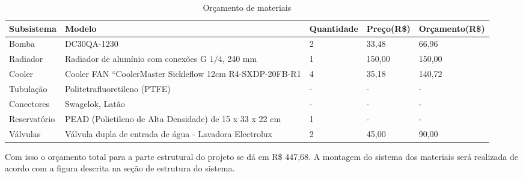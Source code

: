 \begin{table}[htb]
\begin{tabular}{|p{3cm}|p{4cm}|p{3cm}|p{2cm}|p{3cm}|}
\hline
Subsistema & Modelo & Quantidade & Preço(R\$) & Orçamento(R\$) \\
\hline
Bomba & DC30QA-1230  & 2 & 33,48 & 66,96 \\ \hline
Radiador & Radiador de alumínio com conexões G $1/4$, 240 mm & 1 & 150,00 & 150,00\\ \hline
Cooler & Cooler FAN “CoolerMaster Sickleflow 12cm R4-SXDP-20FB-R1 & 4 & 35,18 & 140,72\\ \hline
Tubulação & Politetrafluoretileno (PTFE) & - & - & -\\ \hline
Conectores & Swagelok, Latão & - & -  & - \\ \hline
Reservatório & PEAD (Polietileno de Alta Densidade) de 15 x 33 x 22 cm & 1 & - & - \\ \hline
Válvulas & Válvula dupla de entrada de água - Lavadora Electrolux  & 2 & 45,00 & 90,00\\ \hline
\hline
\end{tabular}
\caption{Orçamento de materiais}
\end{table}

Com isso o orçamento total para a parte estrutural do projeto se dá em R\$ 447,68.
A montagem do sistema dos materiais será realizada de acordo com a figura descrita na seção de estrutura do sistema.

\newpage